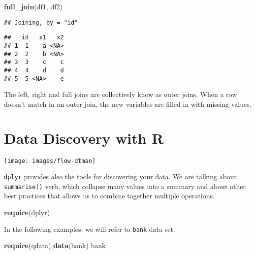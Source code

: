 \documentclass[]{book}
\newenvironment{Shaded}{\begin{snugshade}}{\end{snugshade}}
\newcommand{\KeywordTok}[1]{\textcolor[rgb]{0.13,0.29,0.53}{\textbf{{#1}}}}
\newcommand{\NormalTok}[1]{{#1}}
\begin{document}
\begin{Shaded}
\begin{Highlighting}[]
\KeywordTok{full_join}\NormalTok{(df1, df2)}
\end{Highlighting}
\end{Shaded}

\begin{verbatim}
## Joining, by = "id"
\end{verbatim}

\begin{verbatim}
##   id   x1   x2
## 1  1    a <NA>
## 2  2    b <NA>
## 3  3    c    c
## 4  4    d    d
## 5  5 <NA>    e
\end{verbatim}

The left, right and full joins are collectively know as outer joins.
When a row doesn't match in an outer join, the new variables are filled
in with missing values.

\chapter{Data Discovery with R}\label{data-discovery-with-r}

\texttt{[image: images/flow-dtman]}

\texttt{dplyr} provides also the tools for discovering your data. We are
talking about \texttt{summarise()} verb, which collapse many values into
a summary and about other best practices that allows us to combine
together multiple operations.

\begin{Shaded}
\begin{Highlighting}[]
\KeywordTok{require}\NormalTok{(dplyr)}
\end{Highlighting}
\end{Shaded}

In the following examples, we will refer to \texttt{bank} data set.

\begin{Shaded}
\begin{Highlighting}[]
\KeywordTok{require}\NormalTok{(qdata)}
\KeywordTok{data}\NormalTok{(bank)}
\NormalTok{bank}
\end{Highlighting}
\end{Shaded}
\end{document}
